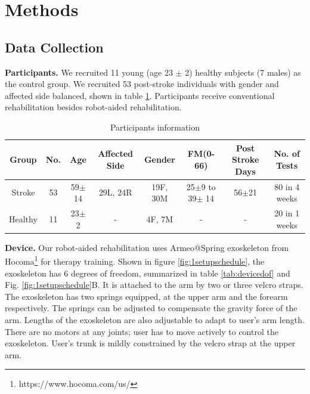 \section{Methods}

\subsection{Data Collection}

\textbf{Participants.} 
We recruited 11 young (age 23 $\pm$ 2) healthy subjects (7 males) as the control group.
We recruited 53 post-stroke individuals with gender and affected side balanced, shown in table \ref{tab:demog}. 
Participants receive conventional rehabilitation besides robot-aided rehabilitation.

\begin{table}[b]
	\begin{tabular}{c c c c c c c c}
		\hline
		Group & No. & Age & Affected Side & Gender & FM(0-66) & Post Stroke Days & No. of Tests\\
		\hline
		Stroke & 53 & 59$\pm$14 & 29L, 24R & 19F, 30M & 25$\pm$9 to 39$\pm$ 14 & 56$\pm$21 & 80 in 4 weeks \\ 
		Healthy & 11 & 23$\pm$2 & - & 4F, 7M & - & - & 20 in 1 weeks \\
		\hline
	\end{tabular}
	\caption{Participants information}
	\label{tab:demog}
\end{table}

\textbf{Device.}
Our robot-aided rehabilitation uses Armeo@Spring exoskeleton from Hocoma\footnote{https://www.hocoma.com/us/} for therapy training. 
Shown in figure \ref{fig:1setupschedule}, the exoskeleton has 6 degrees of freedom, summarized in table \ref{tab:devicedof} and Fig. \ref{fig:1setupschedule}B. 
It is attached to the arm by two or three velcro straps. 
The exoskeleton has two springs equipped, at the upper arm and the forearm respectively. 
The springs can be adjusted to compensate the gravity force of the arm. 
Lengths of the exoskeleton are also adjustable to adapt to user's arm length.
There are no motors at any joints; user has to move actively to control the exoskeleton. 
User's trunk is mildly constrained by the velcro strap at the upper arm.


